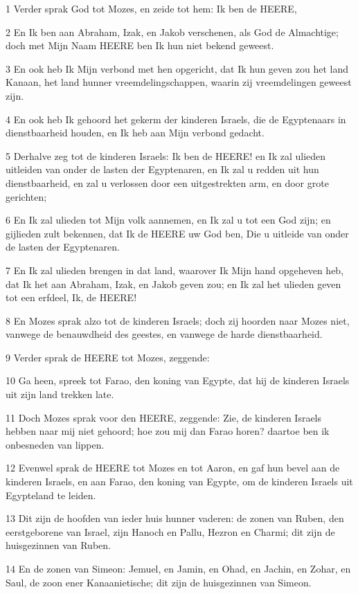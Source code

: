 \par 1 Verder sprak God tot Mozes, en zeide tot hem: Ik ben de HEERE,
\par 2 En Ik ben aan Abraham, Izak, en Jakob verschenen, als God de Almachtige; doch met Mijn Naam HEERE ben Ik hun niet bekend geweest.
\par 3 En ook heb Ik Mijn verbond met hen opgericht, dat Ik hun geven zou het land Kanaan, het land hunner vreemdelingschappen, waarin zij vreemdelingen geweest zijn.
\par 4 En ook heb Ik gehoord het gekerm der kinderen Israels, die de Egyptenaars in dienstbaarheid houden, en Ik heb aan Mijn verbond gedacht.
\par 5 Derhalve zeg tot de kinderen Israels: Ik ben de HEERE! en Ik zal ulieden uitleiden van onder de lasten der Egyptenaren, en Ik zal u redden uit hun dienstbaarheid, en zal u verlossen door een uitgestrekten arm, en door grote gerichten;
\par 6 En Ik zal ulieden tot Mijn volk aannemen, en Ik zal u tot een God zijn; en gijlieden zult bekennen, dat Ik de HEERE uw God ben, Die u uitleide van onder de lasten der Egyptenaren.
\par 7 En Ik zal ulieden brengen in dat land, waarover Ik Mijn hand opgeheven heb, dat Ik het aan Abraham, Izak, en Jakob geven zou; en Ik zal het ulieden geven tot een erfdeel, Ik, de HEERE!
\par 8 En Mozes sprak alzo tot de kinderen Israels; doch zij hoorden naar Mozes niet, vanwege de benauwdheid des geestes, en vanwege de harde dienstbaarheid.
\par 9 Verder sprak de HEERE tot Mozes, zeggende:
\par 10 Ga heen, spreek tot Farao, den koning van Egypte, dat hij de kinderen Israels uit zijn land trekken late.
\par 11 Doch Mozes sprak voor den HEERE, zeggende: Zie, de kinderen Israels hebben naar mij niet gehoord; hoe zou mij dan Farao horen? daartoe ben ik onbesneden van lippen.
\par 12 Evenwel sprak de HEERE tot Mozes en tot Aaron, en gaf hun bevel aan de kinderen Israels, en aan Farao, den koning van Egypte, om de kinderen Israels uit Egypteland te leiden.
\par 13 Dit zijn de hoofden van ieder huis hunner vaderen: de zonen van Ruben, den eerstgeborene van Israel, zijn Hanoch en Pallu, Hezron en Charmi; dit zijn de huisgezinnen van Ruben.
\par 14 En de zonen van Simeon: Jemuel, en Jamin, en Ohad, en Jachin, en Zohar, en Saul, de zoon ener Kanaanietische; dit zijn de huisgezinnen van Simeon.
